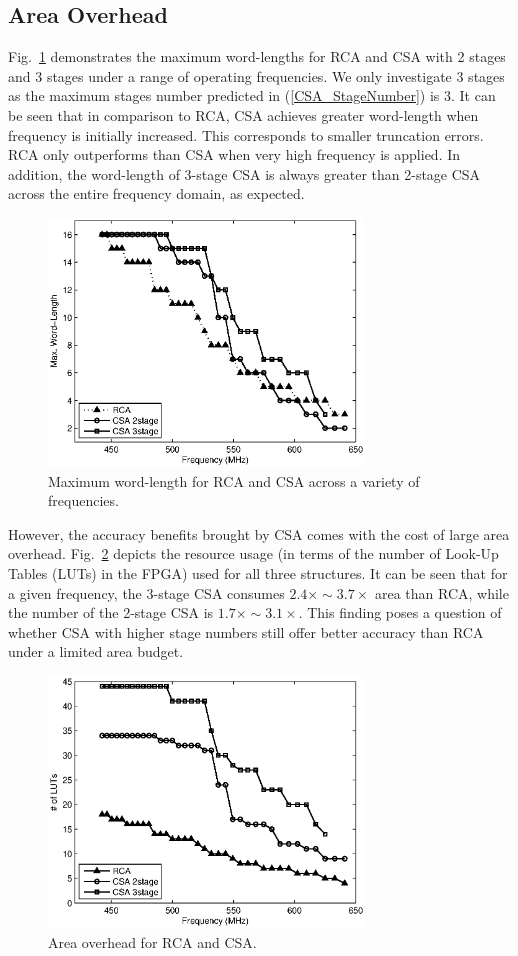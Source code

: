 \documentclass[journal]{IEEEtran}
\begin{document}
\subsection{Area Overhead}
Fig.~\ref{CSA3stage Timing} demonstrates the maximum word-lengths for RCA and CSA with 2 stages and 3 stages under a range of operating frequencies. We only investigate 3 stages as the maximum stages number predicted in (\ref{CSA_StageNumber}) is 3. It can be seen that in comparison to RCA, CSA achieves greater word-length when frequency is initially increased. This corresponds to smaller truncation errors. RCA only outperforms than CSA when very high frequency is applied. In addition, the word-length of 3-stage CSA is always greater than 2-stage CSA across the entire frequency domain, as expected.  
\begin{figure}[htbp]
  \centering
  \includegraphics[width=3.3in]{./Figures/CSA3stage_Timing.eps}
  \caption{Maximum word-length for RCA and CSA across a variety of frequencies.}
  \label{CSA3stage Timing}
\end{figure}

However, the accuracy benefits brought by CSA comes with the cost of large area overhead. Fig.~\ref{CSA3stage Area} depicts the resource usage (in terms of the number of Look-Up Tables (LUTs) in the FPGA) used for all three structures. It can be seen that for a given frequency, the 3-stage CSA consumes $2.4\times\sim3.7\times$ area than RCA, while the number of the 2-stage CSA is $1.7\times\sim3.1\times$. This finding poses a question of whether CSA with higher stage numbers still offer better accuracy than RCA under a limited area budget.
\begin{figure}[htbp]
  \centering
  \includegraphics[width=3.3in]{./Figures/CSA3stage_Area.eps}
  \caption{Area overhead for RCA and CSA.}
  \label{CSA3stage Area}
\end{figure}
\end{document}

